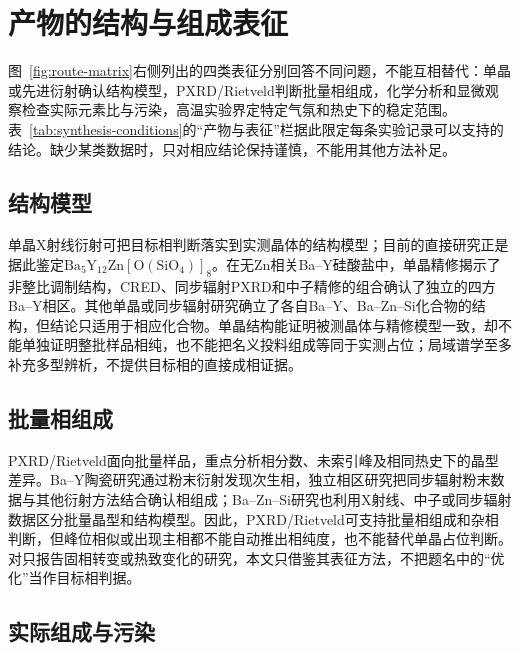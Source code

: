 \section{产物的结构与组成表征}
\label{sec:validation-endpoints}

图~\ref{fig:route-matrix}右侧列出的四类表征分别回答不同问题，不能互相替代：单晶或先进衍射确认结构模型，PXRD/Rietveld判断批量相组成，化学分析和显微观察检查实际元素比与污染，高温实验界定特定气氛和热史下的稳定范围。表~\ref{tab:synthesis-conditions}的“产物与表征”栏据此限定每条实验记录可以支持的结论。缺少某类数据时，只对相应结论保持谨慎，不能用其他方法补足。

\subsection{结构模型}

单晶X射线衍射可把目标相判断落实到实测晶体的结构模型；目前的直接研究正是据此鉴定$\mathrm{Ba_5Y_{12}Zn[O(SiO_4)]_8}$\cite{ababaikeri2024ba5y12zn}。在无Zn相关Ba--Y硅酸盐中，单晶精修揭示了非整比调制结构，CRED、同步辐射PXRD和中子精修的组合确认了独立的四方Ba--Y相区\cite{yamane2024synthesis,gulay2024navigation}。其他单晶或同步辐射研究确立了各自Ba--Y、Ba--Zn--Si化合物的结构，但结论只适用于相应化合物\cite{motozawa2022bay16si4o33,zou2021crystal}。单晶结构能证明被测晶体与精修模型一致，却不能单独证明整批样品相纯，也不能把名义投料组成等同于实测占位；局域谱学至多补充多型辨析，不提供目标相的直接成相证据\cite{becerro2004revisiting}。

\subsection{批量相组成}

PXRD/Rietveld面向批量样品，重点分析相分数、未索引峰及相同热史下的晶型差异。Ba--Y陶瓷研究通过粉末衍射发现次生相，独立相区研究把同步辐射粉末数据与其他衍射方法结合确认相组成\cite{yamane2024microstructure,gulay2024navigation}；Ba--Zn--Si研究也利用X射线、中子或同步辐射数据区分批量晶型和结构模型\cite{lin1999phase,zou2021crystal}。因此，PXRD/Rietveld可支持批量相组成和杂相判断，但峰位相似或出现主相都不能自动推出相纯度，也不能替代单晶占位判断。对只报告固相转变或热致变化的研究，本文只借鉴其表征方法，不把题名中的“优化”当作目标相判据\cite{kerstan2012thermal,cai2024optimized}。

\subsection{实际组成与污染}

